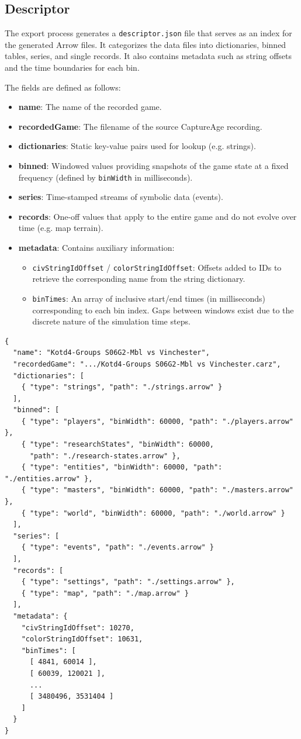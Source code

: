 \subsection{Descriptor}
The export process generates a \texttt{descriptor.json} file that serves as an index for the generated Arrow files. It categorizes the data files into dictionaries, binned tables, series, and single records. It also contains metadata such as string offsets and the time boundaries for each bin.

The fields are defined as follows:
\begin{itemize}
  \item \textbf{name}: The name of the recorded game.
  \item \textbf{recordedGame}: The filename of the source CaptureAge recording.
  \item \textbf{dictionaries}: Static key-value pairs used for lookup (e.g. strings).
  \item \textbf{binned}: Windowed values providing snapshots of the game state at a fixed frequency (defined by \texttt{binWidth} in milliseconds).
  \item \textbf{series}: Time-stamped streams of symbolic data (events).
  \item \textbf{records}: One-off values that apply to the entire game and do not evolve over time (e.g. map terrain).
  \item \textbf{metadata}: Contains auxiliary information:
    \begin{itemize}
      \item \texttt{civStringIdOffset} / \texttt{colorStringIdOffset}: Offsets added to IDs to retrieve the corresponding name from the string dictionary.
      \item \texttt{binTimes}: An array of inclusive start/end times (in milliseconds) corresponding to each bin index. Gaps between windows exist due to the discrete nature of the simulation time steps.
    \end{itemize}
\end{itemize}

\begin{verbatim}
{
  "name": "Kotd4-Groups S06G2-Mbl vs Vinchester",
  "recordedGame": ".../Kotd4-Groups S06G2-Mbl vs Vinchester.carz",
  "dictionaries": [
    { "type": "strings", "path": "./strings.arrow" }
  ],
  "binned": [
    { "type": "players", "binWidth": 60000, "path": "./players.arrow" },
    { "type": "researchStates", "binWidth": 60000,
      "path": "./research-states.arrow" },
    { "type": "entities", "binWidth": 60000, "path": "./entities.arrow" },
    { "type": "masters", "binWidth": 60000, "path": "./masters.arrow" },
    { "type": "world", "binWidth": 60000, "path": "./world.arrow" }
  ],
  "series": [
    { "type": "events", "path": "./events.arrow" }
  ],
  "records": [
    { "type": "settings", "path": "./settings.arrow" },
    { "type": "map", "path": "./map.arrow" }
  ],
  "metadata": {
    "civStringIdOffset": 10270,
    "colorStringIdOffset": 10631,
    "binTimes": [
      [ 4841, 60014 ],
      [ 60039, 120021 ],
      ...
      [ 3480496, 3531404 ]
    ]
  }
}
\end{verbatim}


